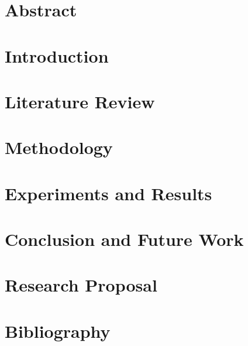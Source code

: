 \documentclass[12pt,a4paper,final,titlepage,openany]{report}
\begin{document}


\restoregeometry
\sloppy
\frontmatter

\chapter*{Abstract}
\label{chap:abstract}


\pagebreak

\setcounter{tocdepth}{2}
\tableofcontents
\pagebreak
\listoffigures
\pagebreak
\listoftables

\mainmatter
\raggedbottom

\chapter{Introduction}
\label{chap:introduction}


\chapter{Literature Review}
\label{chap:literature}


\chapter{Methodology}
\label{chap:methodology}


\chapter{Experiments and Results}
\label{chap:results}


\chapter{Conclusion and Future Work}
\label{chap:conclusion}


\appendix
{}
\chapter{Research Proposal}
\label{apx:proposal}




\chapter*{Bibliography}
\label{bibliography}

\setlength{\bibsep}{2pt}
\let\oldaddcontentsline\addcontentsline%
\renewcommand{\addcontentsline}[3]{}%
\renewcommand{\bibname}{}

\let\addcontentsline\oldaddcontentsline%
\end{document}
